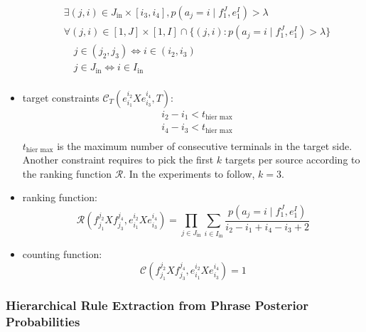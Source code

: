 \begin{itemize}
\begin{equation}
\begin{split}
    & \exists (j,i) \in J_{\text{in}} \times [i_3, i_4], p(a_j = i \mid f_1^J, e_1^I) > \lambda \\
    & \forall (j,i) \in [1, J] \times [1, I] \cap \{(j,i): p(a_j = i \mid f_1^J,e_1^I) > \lambda\} \\
    & \hspace{1em} j \in (j_2, j_3) \Leftrightarrow i \in (i_2, i_3) \\
    & \hspace{1em} j \in J_{\text{in}} \Leftrightarrow i \in I_{\text{in}} \\
  \end{split}
  \label{eq:alignmentConstraintsLinkHierarchical}
\end{equation}
%
  \item target constraints $\mathcal{C}_T(e_{i_1}^{i_2} X e_{i_3}^{i_4}, T)$:
%
\begin{equation}
  \begin{split}
    & i_2 - i_1 < t_{\text{hier max}} \\
    & i_4 - i_3 < t_{\text{hier max}} \\
  \end{split}
\end{equation}
%
$t_{\text{hier max}}$ is the maximum number of consecutive terminals in the target
side. Another constraint requires to pick the first $k$ targets per source
according to the ranking function $\mathcal{R}$. In the experiments to follow, $k = 3$.
  \item ranking function:
%
\begin{equation} \label{eq:linkPosRankingHierarchical}
  \mathcal{R}(f_{j_1}^{j_2} X f_{j_3}^{j_4}, e_{i_1}^{i_2} X e_{i_3}^{i_4}) = \prod_{j \in J_{\text{in}}} \sum_{i \in I_{\text{in}}} \frac{p(a_j = i \mid f_1^J,e_1^I)}{i_2-i_1+i_4-i_3+2}
\end{equation}
%
  \item counting function:
\begin{equation}
  \mathcal{C}(f_{j_1}^{j_2} X f_{j_3}^{j_4}, e_{i_1}^{i_2} X e_{i_3}^{i_4}) = 1
\end{equation}
\end{itemize}
%

\subsubsection{Hierarchical Rule Extraction from Phrase Posterior Probabilities}

